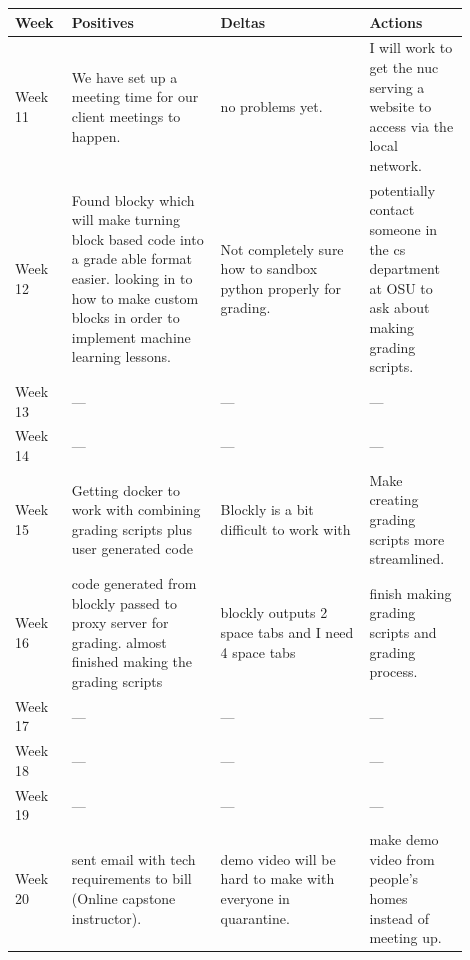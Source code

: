 \documentclass[draftclsnofoot,10pt,onecolumn]{IEEEtran}
\begin{document}
        \begin{tabular}{p{0.1\linewidth}p{0.3\linewidth}p{0.3\linewidth}p{0.2\linewidth}}
        \hline
            \textbf{Week}
             & \textbf{Positives}
             & \textbf{Deltas}
             & \textbf{Actions}\\
            \hline
             Week 11
             & We have set up a meeting time for our client meetings to happen.
             & no problems yet.
             & I will work to get the nuc serving a website to access via the local network.\\
            \hline
             Week 12
             & Found blocky which will make turning block based code into a grade able format easier. looking in to how to make custom blocks in order to implement machine learning lessons.
             & Not completely sure how to sandbox python properly for grading.
             & potentially contact someone in the cs department at OSU to ask about making grading scripts.\\
            \hline
             Week 13
             & ---
             & ---
             & ---\\
            \hline
             Week 14
             & ---
             & ---
             & ---\\
             \hline
             Week 15
             & Getting docker to work with combining grading scripts plus user generated code
             & Blockly is a bit difficult to work with
             & Make creating grading scripts more streamlined.\\
             \hline
             Week 16
             & code generated from blockly passed to proxy server for grading. almost finished making the grading scripts
             & blockly outputs 2 space tabs and I need 4 space tabs
             & finish making grading scripts and grading process.\\
             \hline
             Week 17
             & ---
             & ---
             & ---\\
             \hline
             Week 18
             & ---
             & ---
             & ---\\
             \hline
             Week 19
             & ---
             & ---
             & ---\\
             \hline
             Week 20
             & sent email with tech requirements to bill (Online capstone instructor). 
             & demo video will be hard to make with everyone in quarantine.
             &  make demo video from people's homes instead of meeting up. \\
            \hline
            \end{tabular}
            \newpage
\end{document}
